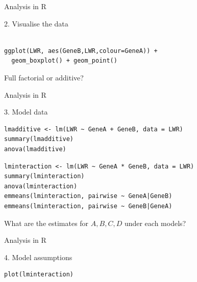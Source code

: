 \documentclass{beamer}
\makeatletter
\newenvironment{kframe}{%
 \def\at@end@of@kframe{}%
 \ifinner\ifhmode%
  \def\at@end@of@kframe{\end{minipage}}%
  \begin{minipage}{\columnwidth}%
 \fi\fi%
 \def\FrameCommand##1{\hskip\@totalleftmargin \hskip-\fboxsep
 \colorbox{shadecolor}{##1}\hskip-\fboxsep
     \hskip-\linewidth \hskip-\@totalleftmargin \hskip\columnwidth}%
 \MakeFramed {\advance\hsize-\width
   \@totalleftmargin\z@ \linewidth\hsize
   \@setminipage}}%
 {\par\unskip\endMakeFramed%
 \at@end@of@kframe}
\newenvironment{knitrout}{}{} %
\makeatother
\begin{document}
\begin{frame}[fragile]{Analysis in R}
 
2. Visualise the data

 \begin{knitrout}
\color{fgcolor}\begin{kframe}
\begin{verbatim}

ggplot(LWR, aes(GeneB,LWR,colour=GeneA)) +
  geom_boxplot() + geom_point()
 \end{verbatim}
\end{kframe}
\end{knitrout}
 
 Full factorial or additive?
 
\end{frame}



\begin{frame}[fragile]{Analysis in R}
 
3. Model data

 \begin{knitrout}
\color{fgcolor}\begin{kframe}
\begin{verbatim}
lmadditive <- lm(LWR ~ GeneA + GeneB, data = LWR)
summary(lmadditive)
anova(lmadditive)
 \end{verbatim}
\end{kframe}
\end{knitrout}

 \begin{knitrout}
\color{fgcolor}\begin{kframe}
\begin{verbatim}
lminteraction <- lm(LWR ~ GeneA * GeneB, data = LWR)
summary(lminteraction)
anova(lminteraction)
emmeans(lminteraction, pairwise ~ GeneA|GeneB)
emmeans(lminteraction, pairwise ~ GeneB|GeneA)
 \end{verbatim}
\end{kframe}
\end{knitrout}

What are the estimates for $A, B, C, D$ under each models?
\end{frame}



\begin{frame}[fragile]{Analysis in R}
 
4. Model assumptions

 \begin{knitrout}
\color{fgcolor}\begin{kframe}
\begin{verbatim}
plot(lminteraction)
 \end{verbatim}
\end{kframe}
\end{knitrout}

\end{frame}
\end{document}
